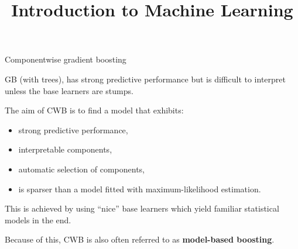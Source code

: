 \documentclass[11pt,compress,t,notes=noshow, xcolor=table]{beamer}
\title{Introduction to Machine Learning}
\begin{document}

\begin{vbframe}{Componentwise gradient boosting}

GB (with trees), has strong predictive
performance but is difficult to interpret unless the base learners are stumps.

\lz

The aim of CWB is to find a model that exhibits:

\begin{itemize}
  \item
    strong predictive performance,

  \item
    interpretable components,

  \item
    automatic selection of components,

  \item
    is sparser than a model fitted with maximum-likelihood estimation.
\end{itemize}

\lz

This is achieved by using \enquote{nice} base learners which yield familiar
statistical models
in the end.

\lz

Because of this, CWB is also often referred to as \textbf{model-based boosting}.

\end{vbframe}

\end{document}
